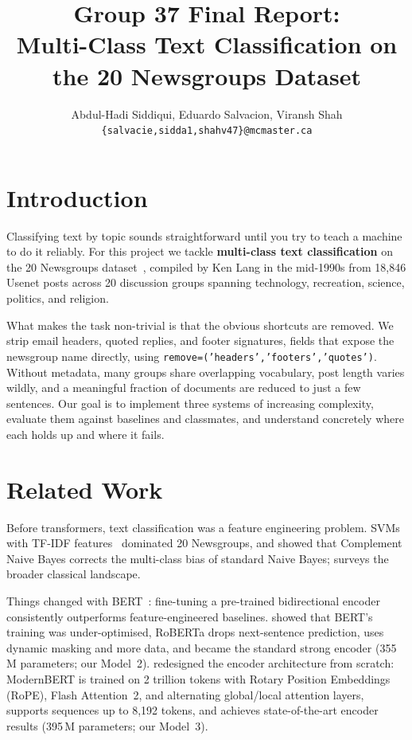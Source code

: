 \documentclass[11pt]{article}
\title{Group 37 Final Report:\\
Multi-Class Text Classification on the 20 Newsgroups Dataset}
\author{Abdul-Hadi Siddiqui, Eduardo Salvacion, Viransh Shah \\
  \texttt{\{salvacie,sidda1,shahv47\}@mcmaster.ca} }
\begin{document}
\maketitle

\section{Introduction}

Classifying text by topic sounds straightforward until you try to teach
a machine to do it reliably.  For this project we tackle
\textbf{multi-class text classification} on the 20 Newsgroups
dataset~\citep{Lang95}, compiled by Ken Lang in the mid-1990s from
18,846 Usenet posts across 20 discussion groups spanning technology,
recreation, science, politics, and religion.

What makes the task non-trivial is that the obvious shortcuts are
removed.  We strip email headers, quoted replies, and footer
signatures, fields that expose the newsgroup name directly, using
\texttt{remove=('headers','footers','quotes')}.  Without metadata,
many groups share overlapping vocabulary, post length varies wildly,
and a meaningful fraction of documents are reduced to just a few
sentences.  Our goal is to implement three systems of increasing
complexity, evaluate them against baselines and classmates, and
understand concretely where each holds up and where it fails.

\section{Related Work}

Before transformers, text classification was a feature engineering
problem.  SVMs with TF-IDF features~\citep{Joachims1998} dominated
20 Newsgroups, and \citet{Rennie2003Complement} showed that Complement
Naive Bayes corrects the multi-class bias of standard Naive Bayes;
\citet{Sebastiani2002} surveys the broader classical landscape.

Things changed with BERT~\citep{Devlin2019BERT}: fine-tuning a
pre-trained bidirectional encoder consistently outperforms
feature-engineered baselines.  \citet{Liu2019RoBERTa} showed that
BERT's training was under-optimised, RoBERTa drops next-sentence
prediction, uses dynamic masking and more data, and became the standard
strong encoder (355\,M parameters; our Model~2).
\citet{Warner2024ModernBERT} redesigned the encoder architecture from
scratch: ModernBERT is trained on 2 trillion tokens with Rotary Position
Embeddings (RoPE), Flash Attention~2, and alternating global/local
attention layers, supports sequences up to 8,192 tokens, and achieves
state-of-the-art encoder results (395\,M parameters; our Model~3).
\end{document}
